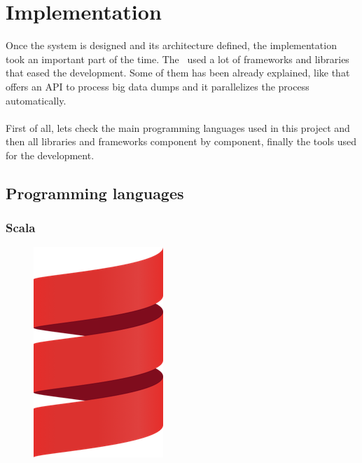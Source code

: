 
\chapter{Implementation}

\label{chapter07}

Once the system is designed and its architecture defined, the implementation took an important part of the time. The \thesis\ used a lot of frameworks and libraries that eased the development. Some of them has been already explained, like  that offers an API to process big data dumps and it parallelizes the process automatically.
\\\\
First of all, lets check the main programming languages used in this project and then all libraries and frameworks component by component, finally the tools used for the development.

\section{Programming languages}

\subsection*{Scala\cite{scala}}

\begin{figure}[H]
\includegraphics[scale=0.1]{resources/scala-logo.png}
\end{figure}

